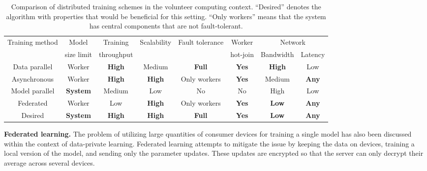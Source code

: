 \begin{table*}[t]
\caption{Comparison of distributed training schemes in the volunteer computing context. ``Desired'' denotes the algorithm with properties that would be beneficial for this setting. ``Only workers'' means that the system has central components that are not fault-tolerant.}
\setlength{\tabcolsep}{3pt}
\hspace{-6pt}\begin{tabular}{cccccccc} 
\toprule
 \multirow{2}{*}{Training method}& Model            & Training       & \multirow{2}{*}{Scalability}    & \multirow{2}{*}{Fault tolerance}             & Worker         & \multicolumn{2}{c}{Network}  \\
         & size limit       & throughput     &                &             & hot-join       & Bandwidth     & Latency                   \\ 
\midrule
Data parallel  & Worker           & \textbf{High } & Medium         & \textbf{Full}         & \textbf{Yes }  & \textbf{High}        & Low                       \\
Asynchronous   & Worker           & \textbf{High } & \textbf{High}  & Only workers\textbf{} & \textbf{Yes }  & Medium        & \textbf{Any}              \\
Model parallel & \textbf{System}  & Medium         & Low            & No                    & No             & High          & Low                       \\
Federated      & Worker           & Low            & \textbf{High}  & Only workers\textbf{} & \textbf{Yes }  & \textbf{Low}        & \textbf{Any}              \\
Desired        & \textbf{System}  & \textbf{High } & \textbf{High}  & \textbf{Full}         & \textbf{Yes }  & \textbf{Low}  & \textbf{Any}              \\
\bottomrule
\end{tabular}
\label{tab:distributed}
\vspace{-12pt}
\end{table*}

\textbf{Federated learning.} The problem of utilizing large quantities of consumer devices for training a single model has also been discussed within the context of data-private learning. Federated learning \cite{mcmahan2017communication} attempts to mitigate the issue by keeping the data on devices, training a local version of the model, and sending only the parameter updates. These updates are encrypted so that the server can only decrypt their average across several devices.

